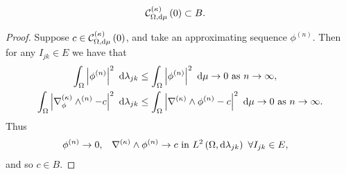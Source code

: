 \begin{lemma} \label{lem:kCurlZeroInB}
	\begin{align*}
		\mathcal{C}_{ \Omega, \mathrm{d}\mu}^{(\kappa)}\left( 0 \right) &\subset B.
	\end{align*}
\end{lemma}
\begin{proof}
	Suppose $c\in\mathcal{C}_{ \Omega, \mathrm{d}\mu}^{(\kappa)}\left( 0 \right)$, and take an approximating sequence $\phi^{(n)}$.
	Then for any $I_{jk}\in E$ we have that
	\begin{align*}
		\int_{\Omega}\left\lvert \phi^{(n)} \right\rvert^2 \ \mathrm{d}\lambda_{jk} 
		&\leq \int_{\Omega}\left\lvert \phi^{(n)} \right\rvert^2 \ \mathrm{d}\mu \rightarrow 0 \ \text{as} \ n \rightarrow\infty, \\
		\int_{\Omega}\left\lvert \nabla_{\phi}^{(\kappa)}\wedge^{(n)} - c \right\rvert^2 \ \mathrm{d}\lambda_{jk}
		&\leq \int_{\Omega}\left\lvert \nabla_{}^{(\kappa)}\wedge\phi^{(n)} - c \right\rvert^2 \ \mathrm{d}\mu \rightarrow 0 \ \text{as} \ n \rightarrow\infty.
	\end{align*}
	Thus
	\begin{align*}
		\phi^{(n)}\rightarrow 0, &\quad \kcurl{}\phi^{(n)}\rightarrow c \text{ in } \ltwo{\ddom}{\lambda_{jk}} \ \forall I_{jk}\in E,
	\end{align*}
	and so $c\in B$.
\end{proof}

